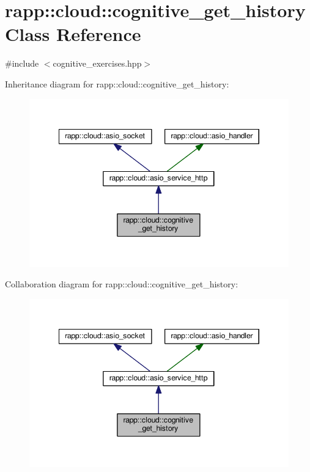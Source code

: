 \hypertarget{classrapp_1_1cloud_1_1cognitive__get__history}{\section{rapp\-:\-:cloud\-:\-:cognitive\-\_\-get\-\_\-history Class Reference}
\label{classrapp_1_1cloud_1_1cognitive__get__history}
}


{\ttfamily \#include $<$cognitive\-\_\-exercises.\-hpp$>$}



Inheritance diagram for rapp\-:\-:cloud\-:\-:cognitive\-\_\-get\-\_\-history\-:
\nopagebreak
\begin{figure}[H]
\begin{center}
\leavevmode
\includegraphics[width=345pt]{classrapp_1_1cloud_1_1cognitive__get__history__inherit__graph}
\end{center}
\end{figure}


Collaboration diagram for rapp\-:\-:cloud\-:\-:cognitive\-\_\-get\-\_\-history\-:
\nopagebreak
\begin{figure}[H]
\begin{center}
\leavevmode
\includegraphics[width=345pt]{classrapp_1_1cloud_1_1cognitive__get__history__coll__graph}
\end{center}
\end{figure}
